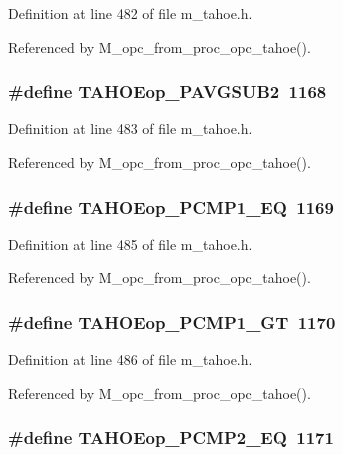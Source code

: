 Definition at line 482 of file m\_\-tahoe.h.

Referenced by M\_\-opc\_\-from\_\-proc\_\-opc\_\-tahoe().
\subsubsection{\setlength{\rightskip}{0pt plus 5cm}\#define TAHOEop\_\-PAVGSUB2~1168}\label{m__tahoe_8h_223c7c58c8387251198dc2a26c375c74}




Definition at line 483 of file m\_\-tahoe.h.

Referenced by M\_\-opc\_\-from\_\-proc\_\-opc\_\-tahoe().
\subsubsection{\setlength{\rightskip}{0pt plus 5cm}\#define TAHOEop\_\-PCMP1\_\-EQ~1169}\label{m__tahoe_8h_864ebca7772d754212fc1adb006d38d4}




Definition at line 485 of file m\_\-tahoe.h.

Referenced by M\_\-opc\_\-from\_\-proc\_\-opc\_\-tahoe().
\subsubsection{\setlength{\rightskip}{0pt plus 5cm}\#define TAHOEop\_\-PCMP1\_\-GT~1170}\label{m__tahoe_8h_79abdd2925f06557f8e47539c8419588}




Definition at line 486 of file m\_\-tahoe.h.

Referenced by M\_\-opc\_\-from\_\-proc\_\-opc\_\-tahoe().
\subsubsection{\setlength{\rightskip}{0pt plus 5cm}\#define TAHOEop\_\-PCMP2\_\-EQ~1171}\label{m__tahoe_8h_9cb121d89fa2319f4ecbc075daf0b457}




